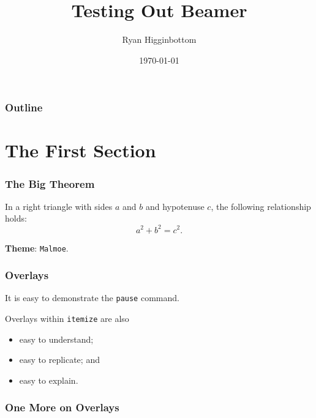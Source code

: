 \documentclass{beamer}
\title{Testing Out Beamer}
\author{Ryan Higginbottom}
\institute{W\&J College}
\date{\today}
\begin{document}
\begin{frame}
  \titlepage
\end{frame}

\begin{frame}
  \frametitle{Outline}
  \tableofcontents
\end{frame}

\section{The First Section}

\begin{frame}
  \frametitle{The Big Theorem}
  \begin{theorem}
  In a right triangle with sides $a$ and $b$ and hypotenuse $c$, the following relationship holds:
  \[
    a^2+b^2=c^2.
  \]
  \end{theorem}
\vspace{.2in} \textbf{Theme}: \texttt{Malmoe}.
\end{frame}

\begin{frame}
\frametitle{Overlays}

It is easy to demonstrate \pause the \texttt{pause} command. \pause

\vspace{.2in}

Overlays within \texttt{itemize} are also
\begin{itemize}
\item<4> easy to understand;
\item<5-6> easy to replicate; and
\item<4,6> easy to explain.
\end{itemize}
\end{frame}

\begin{frame}
\frametitle{One More on Overlays}

 

\vspace{.3in}

\Large {} \normalsize

\vspace{.4in}

\end{frame}
\end{document}
